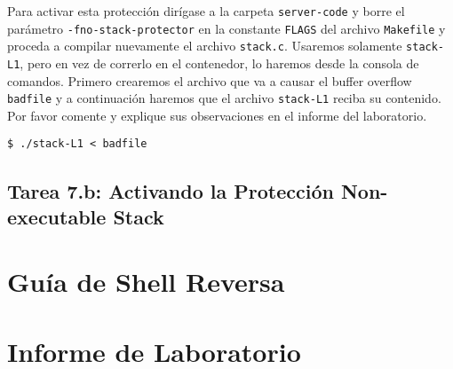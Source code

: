 Para activar esta protección dirígase a la carpeta \texttt{server-code} y borre el parámetro \texttt{-fno-stack-protector} en la constante \texttt{FLAGS} del archivo \texttt{Makefile} y proceda a compilar nuevamente el archivo \texttt{stack.c}.
Usaremos solamente \texttt{stack-L1}, pero en vez de correrlo en el contenedor, lo haremos desde la consola de comandos. Primero crearemos el archivo que va a causar el buffer overflow \texttt{badfile} y a continuación haremos que el archivo \texttt{stack-L1} reciba su contenido. Por favor comente y explique sus observaciones en el informe del laboratorio.

\begin{lstlisting}
$ ./stack-L1 < badfile 
\end{lstlisting}
 

\subsection{Tarea 7.b: Activando la Protección Non-executable Stack}




\section{Guía de Shell Reversa} 
\label{sec:guildelines}






\section{Informe de Laboratorio}




